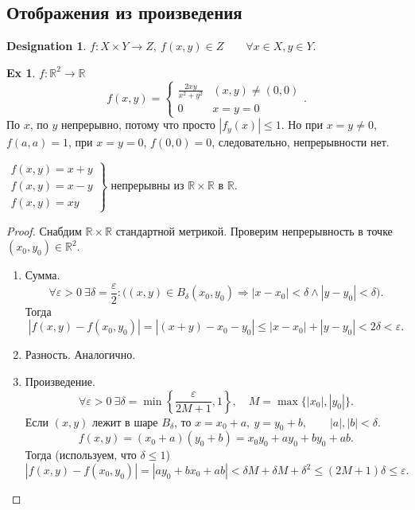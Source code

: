 \documentclass[11pt]{book}
\newcommand{\R}{\mathbb{R}}
\renewcommand{\le}{\leqslant}
\theoremstyle{definition}
\theoremstyle{plain}
\theoremstyle{plain}
\theoremstyle{definition}
\newtheorem*{ex}{Ex}
\newtheorem*{name}{Designation}
\theoremstyle{remark}
\begin{document}
\subsection{Отображения из произведения}
\begin{name}
    $ f: X \times Y \to  Z, ~ f(x, y) \in Z \qquad \forall  x \in X, y \in Y$.
\end{name}
\begin{ex}
    $ f: \R^2 \to  \R$
\[
    f(x, y) = 
    \begin{cases}
	\frac{2xy}{x^2+y^2} & (x, y) \ne (0, 0)\\
	0 & x=y=0
    \end{cases}
.\] 
По $ x$, по $ y$ непрерывно, потому что просто $ |f_y(x)| \le 1$. Но при $ x=y\ne 0$,  $ f(a, a) = 1$, при $ x=y=0$,  $ f(0, 0) = 0$, следовательно, непрерывности нет.
\end{ex}
\begin{thm}
$ $\\
    $
    \left.
    \begin{array}{l}
	f(x, y) = x+y \\
	f(x, y) = x - y \\
	f(x, y) = xy
    \end{array}
\right\}
    $ непрерывны из $ \R \times \R$ в $ \R$.
\end{thm}
\begin{proof}
    Снабдим $ \R \times \R$ стандартной метрикой.
    Проверим непрерывность в точке $ (x_0, y_0) \in \R^2$.
    \begin{enumerate}
        \item Сумма.
	    \[
		\forall \varepsilon >0 ~ \exists \delta = \frac{\varepsilon}{2}: \bigl( (x, y) \in B_{\delta}(x_0, y_0) \Longrightarrow |x-x_0| < \delta \wedge |y-y_0|<\delta \bigr)
	    .\] 
	    Тогда 
	     \[
		 |f(x, y) - f(x_0, y_0)| = |(x+ y) - x_0 - y_0| \le |x - x_0| + |y - y_0| < 2\delta < \varepsilon 
	    .\] 
	\item Разность. Аналогично.
	\item Произведение.
	    \[
	    \forall  \varepsilon >0 ~\exists \delta = \min \left\{ \frac{\varepsilon}{2M + 1}, 1 \right\}, \quad M = \max \{|x_0|, |y_0|\} 
	    .\] 
	    Если $ (x, y)$ лежит в шаре  $ B_{\delta}$, то $ x = x_0 + a, ~ y = y_0+b, \qquad |a|, |b| < \delta$.
	    \[
		f(x, y) = (x_0+a)(y_0+b) = x_0y_0+ay_0+by_0+ab
	    .\] 
	    Тогда  (используем, что $ \delta \le 1$)
	    \[
		|f(x, y) - f(x_0, y_0)| = |ay_0+bx_0+ab|<\delta M + \delta M + \delta^2 \le (2M+1) \delta \le \varepsilon 
	    .\] 
    \end{enumerate}
\end{proof}
\end{document}
